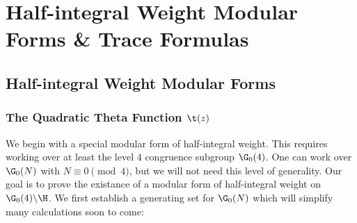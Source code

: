 \part{Half-integral Weight Modular Forms \& Trace Formulas}
  \chapter{Half-integral Weight Modular Forms}
    \section{The Quadratic Theta Function \texorpdfstring{$\t(z)$}{O(z)}}
      We begin with a special modular form of half-integral weight. This requires working over at least the level $4$ congruence subgroup $\G_{0}(4)$. One can work over $\G_{0}(N)$ with $N \equiv 0 \pmod{4}$, but we will not need this level of generality. Our goal is to prove the existance of a modular form of half-integral weight on $\G_{0}(4)\backslash\H$. We first establish a generating set for $\G_{0}(N)$ which will simplify many calculations soon to come:

